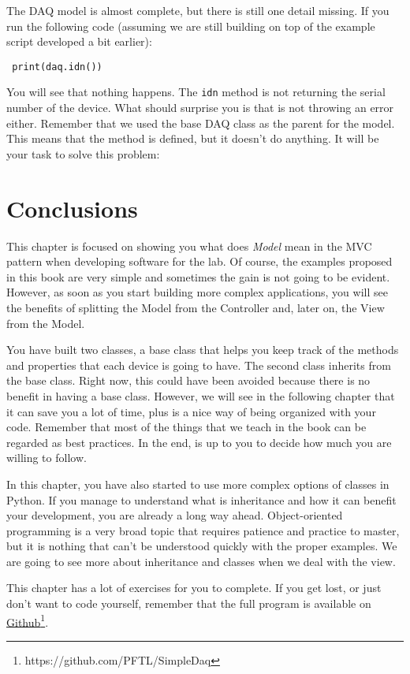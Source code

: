 

The DAQ model is almost complete, but there is still one detail missing. If you run the following code (assuming we are still building on top of the example script developed a bit earlier):

\begin{verbatim}
 print(daq.idn())
\end{verbatim}

You will see that nothing happens. The \texttt{idn} method is not returning the serial number of the device. What should surprise you is that is not throwing an error either. Remember that we used the base DAQ class as the parent for the model. This means that the method is defined, but it doesn't do anything. It will be your task to solve this problem:


\section{Conclusions}\label{conclusions}
This chapter is focused on showing you what does \emph{Model} mean in the {MVC} pattern when developing software for the lab. Of course, the examples proposed in this book are very simple and sometimes the gain is not going to be evident. However, as soon as you start building more complex applications, you will see the benefits of splitting the Model from the Controller and, later on, the View from the Model. 

You have built two classes, a base class that helps you keep track of the methods and properties that each device is going to have. The second class inherits from the base class. Right now, this could have been avoided because there is no benefit in having a base class. However, we will see in the following chapter that it can save you a lot of time, plus is a nice way of being organized with your code. Remember that most of the things that we teach in the book can be regarded as best practices. In the end, is up to you to decide how much you are willing to follow. 

In this chapter, you have also started to use more complex options of classes in Python. If you manage to understand what is inheritance and how it can benefit your development, you are already a long way ahead. Object-oriented programming is a very broad topic that requires patience and practice to master, but it is nothing that can't be understood quickly with the proper examples. We are going to see more about inheritance and classes when we deal with the view. 

This chapter has a lot of exercises for you to complete. If you get lost, or just don't want to code yourself, remember that the full program is available on \href{https://github.com/PFTL/SimpleDaq}{Github}\footnote{https://github.com/PFTL/SimpleDaq}.

